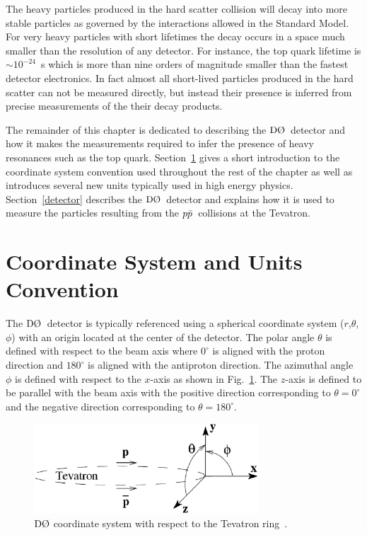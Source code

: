 The heavy particles produced in the hard scatter collision will decay into more stable particles as governed by the interactions allowed in the Standard Model. For very heavy particles with short lifetimes the decay occurs in a space much smaller than the resolution of any detector. For instance, the top quark lifetime is $\sim10^{-24}$~s which is more than nine orders of magnitude smaller than the fastest detector electronics. In fact almost all short-lived particles produced in the hard scatter can not be measured directly, but instead their presence is inferred from precise measurements of the their decay products.

The remainder of this chapter is dedicated to describing the $\dzero$~detector and how it makes the measurements required to infer the presence of heavy resonances such as the top quark. Section~\ref{coordinate} gives a short introduction to the coordinate system convention used throughout the rest of the chapter as well as introduces several new units typically used in high energy physics. Section~\ref{detector} describes the $\dzero$~detector and explains how it is used to measure the particles resulting from the $\mbox{$p\bar{p}$}$~collisions at the Tevatron.

\section{Coordinate System and Units Convention}
\label{coordinate}

The $\dzero$~detector is typically referenced using a spherical coordinate system ($r$,$\theta$,$\phi$) with an origin located at the center of the detector. The polar angle $\theta$ is defined with respect to the beam axis where $0^{\circ}$ is aligned with the proton direction and $180^{\circ}$ is aligned with the antiproton direction. The azimuthal angle $\phi$ is defined with respect to the $x$-axis as shown in Fig.~\ref{coordinate-eps}. The $z$-axis is defined to be parallel with the beam axis with the positive direction corresponding to $\theta = 0^{\circ}$ and the negative direction corresponding to $\theta = 180^{\circ}$.

\begin{figure}[!h!tbp]
\begin{center}
\includegraphics[width=0.75\textwidth]{eps/Tevatron/Coordinate.eps}
\end{center}
\vspace{-0.1in}
\caption{$\dzero$ coordinate system with respect to the Tevatron ring~\cite{Stelzer:2005kz}.}
\label{coordinate-eps}
\end{figure}

